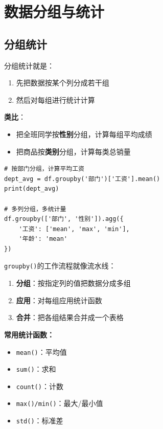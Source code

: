 \documentclass[12pt,a4paper]{article}
\begin{document}
\section{数据分组与统计}

\subsection{分组统计}

\begin{knowledgebox}
分组统计就是：
\begin{enumerate}
    \item 先把数据按某个列分成若干组
    \item 然后对每组进行统计计算
\end{enumerate}

\textbf{类比}：
\begin{itemize}
    \item 把全班同学按\textbf{性别}分组，计算每组平均成绩
    \item 把商品按\textbf{类别}分组，计算每类总销量
\end{itemize}
\end{knowledgebox}

\begin{lstlisting}[caption={分组统计}]
# 按部门分组，计算平均工资
dept_avg = df.groupby('部门')['工资'].mean()
print(dept_avg)

# 多列分组，多统计量
df.groupby(['部门', '性别']).agg({
    '工资': ['mean', 'max', 'min'],
    '年龄': 'mean'
})
\end{lstlisting}

\begin{knowledgebox}
\texttt{groupby()}的工作流程就像流水线：

\begin{enumerate}
    \item \textbf{分组}：按指定列的值把数据分成多组
    \item \textbf{应用}：对每组应用统计函数
    \item \textbf{合并}：把各组结果合并成一个表格
\end{enumerate}

\textbf{常用统计函数：}
\begin{itemize}
    \item \texttt{mean()}：平均值
    \item \texttt{sum()}：求和
    \item \texttt{count()}：计数
    \item \texttt{max()/min()}：最大/最小值
    \item \texttt{std()}：标准差
\end{itemize}
\end{knowledgebox}
\end{document}
